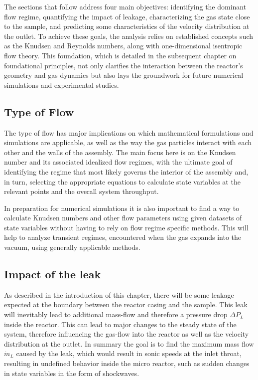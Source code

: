 	The sections that follow address four main objectives: identifying the dominant flow regime, quantifying the impact of leakage, characterizing the gas state close to the sample, and predicting some characteristics of the velocity distribution at the outlet.
	To achieve these goals, the analysis relies on established concepts such as the Knudsen and Reynolds numbers, along with one-dimensional isentropic flow theory.
	This foundation, which is detailed in the subsequent chapter on foundational principles, not only clarifies the interaction between the reactor’s geometry and gas dynamics but also lays the groundwork for future numerical simulations and experimental studies.	

\subsection{Type of Flow}

	The type of flow has major implications on which mathematical formulations and simulations are applicable, as well as the way the gas particles interact with each other and the walls of the assembly. 
	The main focus here is on the Knudsen number and its associated idealized flow regimes, with the ultimate goal of identifying the regime that most likely governs the interior of the assembly and, in turn, selecting the appropriate equations to calculate state variables at the relevant points and the overall system throughput.

	In preparation for numerical simulations it is also important to find a way to calculate Knudsen numbers and other flow parameters using given datasets of state variables without having to rely on flow regime specific methods. This will help to analyze transient regimes, encountered when the gas expands into the vacuum, using generally applicable methods.

\subsection{Impact of the leak}

	As described in the introduction of this chapter, there will be some leakage expected at the boundary between the reactor casing and the sample.
	This leak will inevitably lead to additional mass-flow and therefore a pressure drop $\Delta P_L$ inside the reactor.
	This can lead to major changes to the steady state of the system, therefore influencing the gas-flow into the reactor as well as the velocity distribution at the outlet.
	In summary the goal is to find the maximum mass flow $\dot{m}_L$ caused by the leak, which would result in sonic speeds at the inlet throat, resulting in undefined behavior inside the micro reactor, such as sudden changes in state variables in the form of shockwaves. 

